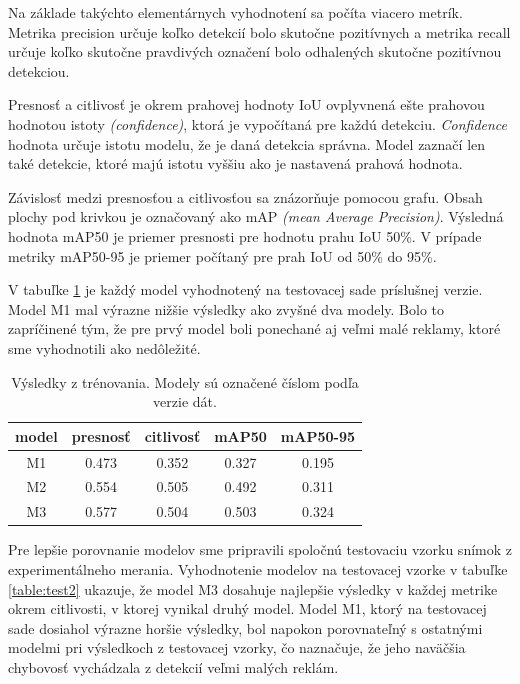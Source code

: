 Na základe takýchto elementárnych vyhodnotení sa počíta viacero metrík. Metrika precision určuje koľko detekcií bolo skutočne pozitívnych a metrika recall určuje koľko skutočne pravdivých označení bolo odhalených skutočne pozitívnou detekciou.

Presnosť a citlivosť je okrem prahovej hodnoty IoU ovplyvnená ešte prahovou hodnotou istoty \textit{(confidence)}, ktorá je vypočítaná pre každú detekciu. \textit{Confidence} hodnota určuje istotu modelu, že je daná detekcia správna. Model zaznačí len také detekcie, ktoré majú istotu vyššiu ako je nastavená prahová hodnota.

Závislosť medzi presnosťou a citlivosťou sa znázorňuje pomocou grafu. Obsah plochy pod krivkou je označovaný ako mAP \textit{(mean Average Precision)}. Výsledná hodnota mAP50 je priemer presnosti pre hodnotu prahu IoU 50\%. V prípade metriky mAP50-95 je priemer počítaný pre prah IoU od 50\% do 95\%.

V tabuľke \ref{table:test1} je každý model vyhodnotený na testovacej sade príslušnej verzie. Model M1 mal výrazne nižšie výsledky ako zvyšné dva modely. Bolo to zapríčinené tým, že pre prvý model boli ponechané aj veľmi malé reklamy, ktoré sme vyhodnotili ako nedôležité.

\begin{table}[ht]
\centering
\begin{tabular}{ |c c c c c| }
\hline
model & presnosť & citlivosť & mAP50 & mAP50-95 \\
\hline
M1  & 0.473 & 0.352	& 0.327	& 0.195 \\
M2  & 0.554	& 0.505	& 0.492	& 0.311 \\
M3  & 0.577	& 0.504	& 0.503	& 0.324 \\
\hline
\end{tabular}
\caption{Výsledky z trénovania. Modely sú označené číslom podľa verzie dát.}
\label{table:test1}
\end{table}

Pre lepšie porovnanie modelov sme pripravili spoločnú testovaciu vzorku snímok z experimentálneho merania. Vyhodnotenie modelov na testovacej vzorke v tabuľke \ref{table:test2} ukazuje, že model M3 dosahuje najlepšie výsledky v každej metrike okrem citlivosti, v ktorej vynikal druhý model. Model M1, ktorý na testovacej sade dosiahol výrazne horšie výsledky, bol napokon porovnateľný s ostatnými modelmi pri výsledkoch z testovacej vzorky, čo naznačuje, že jeho naväčšia chybovosť vychádzala z detekcií veľmi malých reklám.

